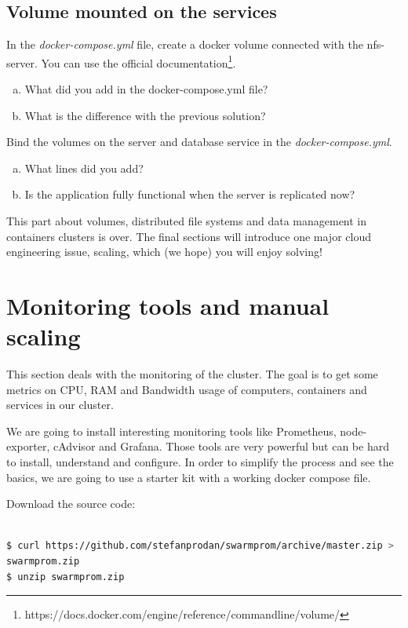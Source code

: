 \documentclass[a4paper,11pt]{exam}
\begin{document}
\subsection{Volume mounted on the services}

\begin{questions}
	\question In the \textit{docker-compose.yml} file, create a docker volume connected with the nfs-server. 
You can use the official documentation\footnote{https://docs.docker.com/engine/reference/commandline/volume/}.
	\begin{enumerate}[(a)]
		\item What did you add in the docker-compose.yml file?
		\item What is the difference with the previous solution?
	\end{enumerate}
	\question Bind the volumes on the server and database service in the \textit{docker-compose.yml}.
	\begin{enumerate}[(a)]
		\item What lines did you add?
		\item Is the application fully functional when the server is replicated now?
	\end{enumerate}
\end{questions}

This part about volumes, distributed file systems and data management in containers clusters is over.
The final sections will introduce one major cloud engineering issue, scaling, which (we hope) you will enjoy solving!

\clearpage

\section{Monitoring tools and manual scaling}

This section deals with the monitoring of the cluster. The goal is to get some metrics on CPU, RAM and Bandwidth usage of computers, containers and services in our cluster.

We are going to install interesting monitoring tools like Prometheus, node-exporter, cAdvisor and Grafana. 
Those tools are very powerful but can be hard to install, understand and configure.
In order to simplify the process and see the basics, we are going to use a starter kit with a working docker compose file.

Download the source code:

\begin{lstlisting}[frame=single,language={sh}]  % Start your code-block

$ curl https://github.com/stefanprodan/swarmprom/archive/master.zip >  \
swarmprom.zip
$ unzip swarmprom.zip

\end{lstlisting}
\end{document}
